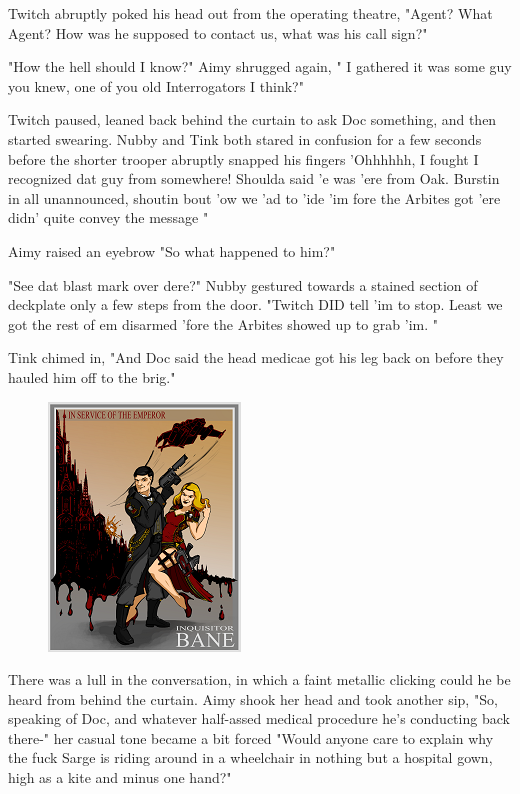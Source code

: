 Twitch abruptly poked his head out from the operating theatre, "Agent? 
What Agent? 
How was he supposed to contact us, what was his call sign?"

"How the hell should I know?" Aimy shrugged again, " I gathered it was some guy you knew, one of you old Interrogators I think?"

Twitch paused, leaned back behind the curtain to ask Doc something, and then started swearing. 
Nubby and Tink both stared in confusion for a few seconds before the shorter trooper abruptly snapped his fingers 'Ohhhhhh, I fought I recognized dat guy from somewhere! 
Shoulda said 'e was 'ere from Oak. 
Burstin in all unannounced, shoutin bout 'ow we 'ad to 'ide 'im fore the Arbites got 'ere didn' quite convey the message  "

Aimy raised an eyebrow "So what happened to him?"

"See dat blast mark over dere?" Nubby gestured towards a stained section of deckplate only a few steps from the door. 
"Twitch DID tell 'im to stop. 
Least we got the rest of em disarmed 'fore the Arbites showed up to grab 'im. 
"

Tink chimed in, "And Doc said the head medicae got his leg back on before they hauled him off to the brig."


\begin{figure}
	\begin{center}
		\includegraphics[width=\figwidth]{pics/20/15.png}
	\end{center}
\end{figure}

There was a lull in the conversation, in which a faint metallic clicking could he be heard from behind the curtain. 
Aimy shook her head and took another sip, "So, speaking of Doc, and whatever half-assed medical procedure he's conducting back there-" her casual tone became a bit forced "Would anyone care to explain why the fuck Sarge is riding around in a wheelchair in nothing but a hospital gown, high as a kite and minus one hand?"

